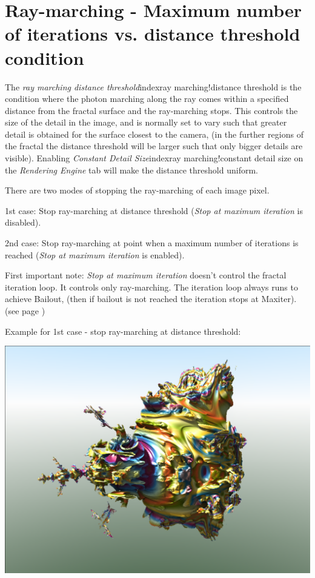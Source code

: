 \section{Ray-marching - Maximum number of iterations vs. distance threshold
	condition}\label{ray-marching---maximum-number-of-iterations-vs.-distance-threshold-condition}

The \emph{ray marching distance threshold}index{ray marching!distance threshold} is the condition where the photon
marching along the ray comes within a specified distance from the fractal
surface and the ray-marching stops. This controls the size of the detail in the
image, and is normally set to vary such that greater detail is obtained for the
surface closest to the camera, (in the further regions of the fractal the
distance threshold will be larger such that only bigger details are visible).
Enabling \emph{Constant Detail Size}index{ray marching!constant detail size} on the \emph{Rendering Engine} tab will
make the distance threshold uniform.

There are two modes of stopping the ray-marching of each image pixel.

1st case: Stop ray-marching at distance threshold (\emph{Stop at maximum
	iteration} is disabled).

2nd case: Stop ray-marching at point when a maximum number of iterations is
reached (\emph{Stop at maximum iteration} is enabled).

First important note: \emph{Stop at maximum iteration} doesn't control the
fractal iteration loop. It controls only ray-marching. The iteration loop always
runs to achieve Bailout, (then if bailout is not reached the iteration stops at
Maxiter). (see page \pageref{bailout-maxiter})

Example for 1st case - stop ray-marching at distance threshold: \nopagebreak

\includegraphics[width=0.5\linewidth]{img/manual/media/stop_raymarching_at_disttrhersh}

